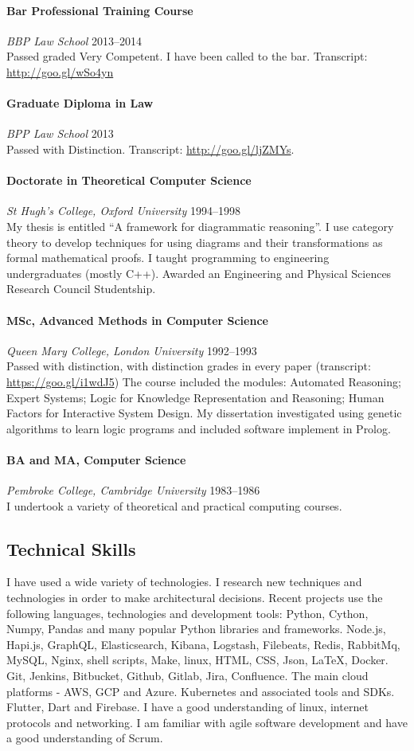 \documentclass[11pt,a4paper]{article}
\newcommand{\centry}[3]{\paragraph{#1} \textit{#2}%
\hfill#3\\[2pt]}
\begin{document}
\centry{Bar Professional Training Course}{BBP Law School}{2013--2014}
 Passed graded Very Competent. I have been called to the bar. Transcript:
\url{http://goo.gl/wSo4yn}


\centry{Graduate Diploma in Law}{BPP Law School}{2013} 
Passed with Distinction. Transcript: \url{http://goo.gl/ljZMYs}.

\centry{Doctorate in Theoretical Computer Science}{St Hugh's College, Oxford
  University} {1994--1998} My thesis is entitled ``A framework for diagrammatic
reasoning''. I use category theory to develop techniques for using diagrams and
their transformations as formal mathematical proofs.  I taught programming to
engineering undergraduates (mostly C++).  Awarded an Engineering and Physical
Sciences Research Council Studentship.


\centry{MSc, Advanced Methods in Computer Science}{Queen Mary College, London
  University}{1992--1993} Passed with distinction, with distinction grades in
every paper (transcript: \url{https://goo.gl/i1wdJ5}) The course included the
modules: Automated Reasoning; Expert Systems; Logic for Knowledge
Representation and Reasoning; Human Factors for Interactive System Design.  My
dissertation investigated using genetic algorithms to learn logic programs and
included software implement in Prolog.

\centry{BA and MA, Computer Science}{Pembroke College, Cambridge University}{1983--1986}
I undertook a variety of theoretical and practical computing courses.

\subsection*{Technical Skills}

I have used a wide variety of technologies. I research new techniques and
technologies in order to make architectural decisions. Recent projects use the
following languages, technologies and development tools: Python, Cython, Numpy,
Pandas and many popular Python libraries and frameworks. Node.js, Hapi.js,
GraphQL, Elasticsearch, Kibana, Logstash, Filebeats, Redis, RabbitMq, MySQL,
Nginx, shell scripts, Make, linux, HTML, CSS, Json, \LaTeX, Docker.  Git,
Jenkins, Bitbucket, Github, Gitlab, Jira, Confluence. The main cloud platforms
- AWS, GCP and Azure. Kubernetes and associated tools and SDKs. Flutter, Dart
and Firebase. I have a good understanding of linux, internet protocols and
networking. I am familiar with agile software development and have a good
understanding of Scrum.
\end{document}

